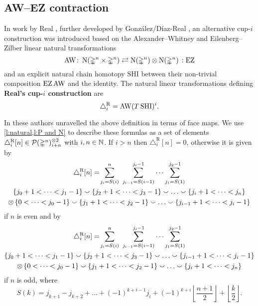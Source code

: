 \subsection{AW--EZ contraction} \label{ss:real}

In work by Real \cite{real1996computability}, further developed by Gonz\'alez\-/D\'iaz\--Real \cite{gonzalez-diaz1999steenrod, gonzalez2003computation, gonzalez-diaz2005cocyclic},
an alternative \mbox{cup-$i$} construction was introduced based on the Alexander--Whitney and Eilenberg--Zilber linear natural transformations
\[
\operatorname{AW} \colon \operatorname{N}(\mathbb{\Delta}^n \times \mathbb{\Delta}^n)
\rightleftarrows
\operatorname{N}(\mathbb{\Delta}^n) \otimes \operatorname{N}(\mathbb{\Delta}^n) \,: \operatorname{EZ}
\]
and an explicit natural chain homotopy $\mathrm{SHI}$ between their non-trivial composition $\operatorname{EZ} \operatorname{AW}$ and the identity.
The natural linear transformations defining \textbf{Real's \mbox{cup-$i$} construction} are
\[
\triangle^{\mathrm{R}}_i = \operatorname{AW} (T \, \mathrm{SHI})^i.
\]

In \cite[Corollary 3.2]{gonzalez-diaz1999steenrod} these authors unravelled the above definition in terms of face maps.
We use \cref{l:natural,l:P and N} to describe these formulas as a set of elements $\triangle_i^{\mathrm{R}} [n] \in \mathcal{P}(\mathbb{\Delta}^n)^{\otimes 2}_{i+n}$ with $i,n \in \mathbb{N}$.
If $i > n$ then $\triangle_i^{\mathrm{R}} [n] = 0$, otherwise it is given by
\begin{multline*}
\triangle^{\mathrm{R}}_i [n] = \!
\sum_{j_i=S(i)}^{n} \ \sum_{j_{i-1}=S(i-1)}^{j_i-1} \dots \sum_{j_1=S(1)}^{j_2-1} \\
\{j_0+1 < \dots < j_1-1\} \union \{j_2+1 < \dots < j_3-1\} \union \dots \union \{j_i+1 < \dots < j_n\} \\ \ot \,
\{0 < \dots < j_0-1\} \union \{j_1+1 < \dots < j_2-1\} \union \dots \union \{j_{i-1}+1 < \dots < j_i-1\}
\end{multline*}
if $n$ is even and by
\begin{multline*}
\triangle^{\mathrm{R}}_i [n] = \!
\sum_{j_i=S(i)}^{n} \ \sum_{j_{i-1}=S(i-1)}^{j_i-1} \dots \sum_{j_1=S(1)}^{j_2-1} \\
\{j_0+1 < \dots < j_1-1\} \union \{j_2+1 < \dots < j_3-1\} \union \dots \union \{j_{i-1}+1 < \dots < j_i-1\} \\ \ot \,
\{0 < \dots < j_0-1\} \union \{j_1+1 < \dots < j_2-1\} \union \dots \union \{j_i+1 < \dots < j_n\}
\end{multline*}
if $n$ is odd, where
\[
S(k) = j_{k+1} - j_{k+2} + \dots + (-1)^{k+i-1} j_i + (-1)^{k+i} \left\lfloor \frac{n+1}{2} \right\rfloor + \left\lfloor \frac{k}{2} \right\rfloor .
\]

